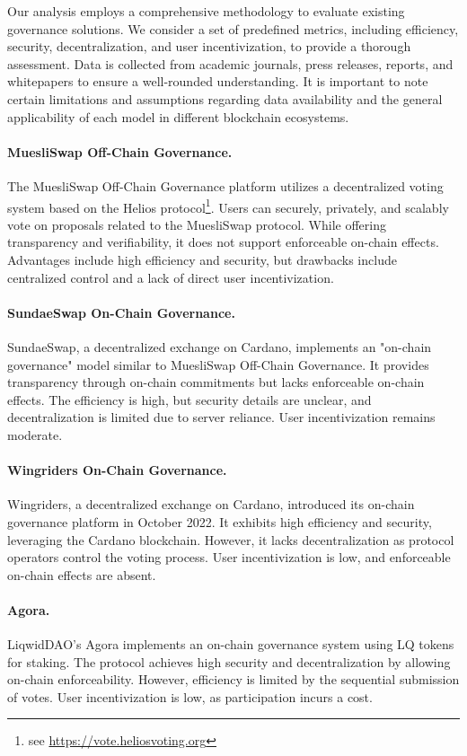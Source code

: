 \documentclass[11pt]{article}
\begin{document}
Our analysis employs a comprehensive methodology to evaluate existing governance solutions. We consider a set of predefined metrics, including efficiency, security, decentralization, and user incentivization, to provide a thorough assessment. Data is collected from academic journals, press releases, reports, and whitepapers to ensure a well-rounded understanding. It is important to note certain limitations and assumptions regarding data availability and the general applicability of each model in different blockchain ecosystems.

\paragraph{MuesliSwap Off-Chain Governance.} The MuesliSwap Off-Chain Governance platform utilizes a decentralized voting system based on the Helios protocol\footnote{see \url{https://vote.heliosvoting.org}}. Users can securely, privately, and scalably vote on proposals related to the MuesliSwap protocol. While offering transparency and verifiability, it does not support enforceable on-chain effects. Advantages include high efficiency and security, but drawbacks include centralized control and a lack of direct user incentivization.

\paragraph{SundaeSwap On-Chain Governance.} SundaeSwap, a decentralized exchange on Cardano, implements an "on-chain governance" model similar to MuesliSwap Off-Chain Governance. It provides transparency through on-chain commitments but lacks enforceable on-chain effects. The efficiency is high, but security details are unclear, and decentralization is limited due to server reliance. User incentivization remains moderate.

\paragraph{Wingriders On-Chain Governance.} Wingriders, a decentralized exchange on Cardano, introduced its on-chain governance platform in October 2022. It exhibits high efficiency and security, leveraging the Cardano blockchain. However, it lacks decentralization as protocol operators control the voting process. User incentivization is low, and enforceable on-chain effects are absent.

\paragraph{Agora.} LiqwidDAO's Agora implements an on-chain governance system using LQ tokens for staking. The protocol achieves high security and decentralization by allowing on-chain enforceability. However, efficiency is limited by the sequential submission of votes. User incentivization is low, as participation incurs a cost.
\end{document}
